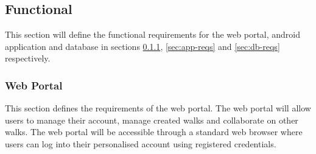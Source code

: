 \documentclass[11pt,a4paper]{article}
\begin{document}
\subsection{Functional}
\label{sec:func-reqs}

This section will define the functional requirements for the web portal, android application and database in sections \ref{sec:req-reg-login}, \ref{sec:app-reqs} and \ref{sec:db-reqs} respectively.

\subsubsection{Web Portal}
\label{sec:req-reg-login}

This section defines the requirements of the web portal. 
The web portal will allow users to manage their account, manage created walks and collaborate on other walks.
The web portal will be accessible through a standard web browser where users can log into their personalised account using registered credentials.
\end{document}
